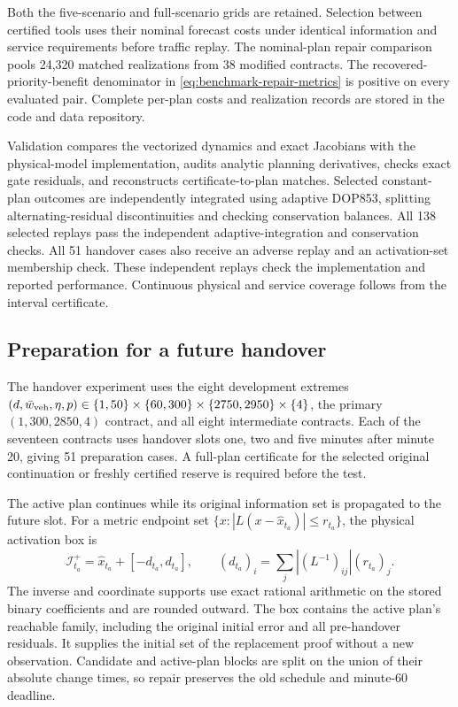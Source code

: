 \documentclass[preprint,12pt]{elsarticle}
\begin{document}
Both the five-scenario and full-scenario grids are retained. Selection
between certified tools uses their nominal forecast costs under identical
information and service requirements before traffic replay. The nominal-plan
repair comparison pools 24,320 matched realizations from 38 modified
contracts. The recovered-priority-benefit denominator in
\eqref{eq:benchmark-repair-metrics} is positive on every evaluated pair.
Complete per-plan costs and realization records are stored in the code
and data repository.

Validation compares the vectorized dynamics and exact Jacobians with the
physical-model implementation, audits analytic planning derivatives,
checks exact gate residuals, and reconstructs certificate-to-plan matches.
Selected constant-plan outcomes are independently integrated using
adaptive DOP853, splitting alternating-residual discontinuities and
checking conservation balances. All 138 selected replays pass the independent adaptive-integration and
conservation checks. All 51 handover cases also receive an adverse replay and an
activation-set membership check. These independent replays check the
implementation and reported performance. Continuous physical and service
coverage follows from the interval certificate.

\subsection{Preparation for a future handover}
\label{supp:detail:sec:delayed-handover-results}
The handover experiment uses the eight development extremes
$(d,\bar w_{\rm veh},\eta,p)\in\{1,50\}\times\{60,300\}\times
\{2750,2950\}\times\{4\}$, the primary $(1,300,2850,4)$ contract,
and all eight intermediate contracts. Each of the seventeen contracts
uses handover slots one, two and five minutes after minute 20, giving
51 preparation cases. A full-plan certificate for the selected original
continuation or freshly certified reserve is required before the test.

The active plan continues while its original information set is
propagated to the future slot. For a metric endpoint set
$\{x:|L(x-\widehat x_{t_a})|\le r_{t_a}\}$, the physical activation box is
\begin{equation}
\mathcal I_{t_a}^+=\widehat x_{t_a}+[-d_{t_a},d_{t_a}],\qquad
(d_{t_a})_i=\sum_j|(L^{-1})_{ij}|(r_{t_a})_j.
\label{eq:benchmark-handover-box}
\end{equation}
The inverse and coordinate supports use exact rational arithmetic on the
stored binary coefficients and are rounded outward. The box contains the
active plan's reachable family, including the original initial error and
all pre-handover residuals. It supplies the initial set of the replacement
proof without a new observation. Candidate and active-plan blocks are
split on the union of their absolute change times, so repair preserves
the old schedule and minute-60 deadline.
\end{document}
